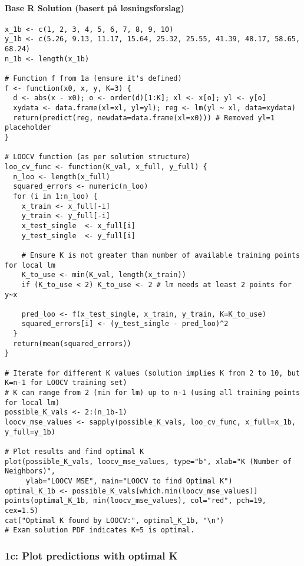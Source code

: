 \documentclass[12pt,a4paper]{article}
\begin{document}
        \paragraph{Base R Solution (basert på løsningsforslag)}
\begin{lstlisting}
x_1b <- c(1, 2, 3, 4, 5, 6, 7, 8, 9, 10)
y_1b <- c(5.26, 9.13, 11.17, 15.64, 25.32, 25.55, 41.39, 48.17, 58.65, 68.24)
n_1b <- length(x_1b)

# Function f from 1a (ensure it's defined)
f <- function(x0, x, y, K=3) {
  d <- abs(x - x0); o <- order(d)[1:K]; xl <- x[o]; yl <- y[o]
  xydata <- data.frame(xl=xl, yl=yl); reg <- lm(yl ~ xl, data=xydata)
  return(predict(reg, newdata=data.frame(xl=x0))) # Removed yl=1 placeholder
}

# LOOCV function (as per solution structure)
loo_cv_func <- function(K_val, x_full, y_full) {
  n_loo <- length(x_full)
  squared_errors <- numeric(n_loo)
  for (i in 1:n_loo) {
    x_train <- x_full[-i]
    y_train <- y_full[-i]
    x_test_single  <- x_full[i]
    y_test_single  <- y_full[i]
    
    # Ensure K is not greater than number of available training points for local lm
    K_to_use <- min(K_val, length(x_train))
    if (K_to_use < 2) K_to_use <- 2 # lm needs at least 2 points for y~x
    
    pred_loo <- f(x_test_single, x_train, y_train, K=K_to_use)
    squared_errors[i] <- (y_test_single - pred_loo)^2
  }
  return(mean(squared_errors))
}

# Iterate for different K values (solution implies K from 2 to 10, but K=n-1 for LOOCV training set)
# K can range from 2 (min for lm) up to n-1 (using all training points for local lm)
possible_K_vals <- 2:(n_1b-1) 
loocv_mse_values <- sapply(possible_K_vals, loo_cv_func, x_full=x_1b, y_full=y_1b)

# Plot results and find optimal K
plot(possible_K_vals, loocv_mse_values, type="b", xlab="K (Number of Neighbors)", 
     ylab="LOOCV MSE", main="LOOCV to find Optimal K")
optimal_K_1b <- possible_K_vals[which.min(loocv_mse_values)]
points(optimal_K_1b, min(loocv_mse_values), col="red", pch=19, cex=1.5)
cat("Optimal K found by LOOCV:", optimal_K_1b, "\n") 
# Exam solution PDF indicates K=5 is optimal.
\end{lstlisting}

    \subsubsection{1c: Plot predictions with optimal K}
\end{document}
